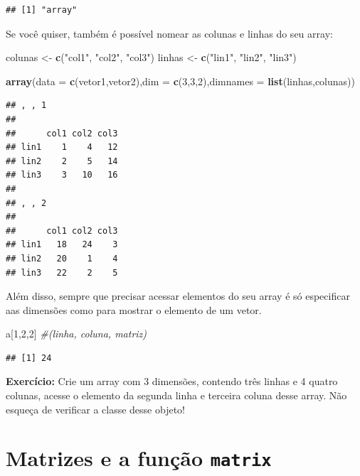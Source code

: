 \documentclass[]{book}
\newenvironment{Shaded}{\begin{snugshade}}{\end{snugshade}}
\newcommand{\KeywordTok}[1]{\textcolor[rgb]{0.13,0.29,0.53}{\textbf{#1}}}
\newcommand{\DataTypeTok}[1]{\textcolor[rgb]{0.13,0.29,0.53}{#1}}
\newcommand{\DecValTok}[1]{\textcolor[rgb]{0.00,0.00,0.81}{#1}}
\newcommand{\StringTok}[1]{\textcolor[rgb]{0.31,0.60,0.02}{#1}}
\newcommand{\CommentTok}[1]{\textcolor[rgb]{0.56,0.35,0.01}{\textit{#1}}}
\newcommand{\NormalTok}[1]{#1}
\theoremstyle{definition}
\theoremstyle{definition}
\theoremstyle{definition}
\theoremstyle{remark}
\begin{document}
\begin{verbatim}
## [1] "array"
\end{verbatim}

Se você quiser, também é possível nomear as colunas e linhas do seu
array:

\begin{Shaded}
\begin{Highlighting}[]
\NormalTok{colunas <-}\StringTok{ }\KeywordTok{c}\NormalTok{(}\StringTok{"col1"}\NormalTok{, }\StringTok{"col2"}\NormalTok{, }\StringTok{"col3"}\NormalTok{)}
\NormalTok{linhas <-}\StringTok{ }\KeywordTok{c}\NormalTok{(}\StringTok{"lin1"}\NormalTok{, }\StringTok{"lin2"}\NormalTok{, }\StringTok{"lin3"}\NormalTok{)}

\KeywordTok{array}\NormalTok{(}\DataTypeTok{data =} \KeywordTok{c}\NormalTok{(vetor1,vetor2),}\DataTypeTok{dim =} \KeywordTok{c}\NormalTok{(}\DecValTok{3}\NormalTok{,}\DecValTok{3}\NormalTok{,}\DecValTok{2}\NormalTok{),}\DataTypeTok{dimnames =} \KeywordTok{list}\NormalTok{(linhas,colunas))}
\end{Highlighting}
\end{Shaded}

\begin{verbatim}
## , , 1
## 
##      col1 col2 col3
## lin1    1    4   12
## lin2    2    5   14
## lin3    3   10   16
## 
## , , 2
## 
##      col1 col2 col3
## lin1   18   24    3
## lin2   20    1    4
## lin3   22    2    5
\end{verbatim}

Além disso, sempre que precisar acessar elementos do seu array é só
especificar aas dimensões como para mostrar o elemento de um vetor.

\begin{Shaded}
\begin{Highlighting}[]
\NormalTok{a[}\DecValTok{1}\NormalTok{,}\DecValTok{2}\NormalTok{,}\DecValTok{2}\NormalTok{] }\CommentTok{#(linha, coluna, matriz)}
\end{Highlighting}
\end{Shaded}

\begin{verbatim}
## [1] 24
\end{verbatim}

\textbf{Exercício:} Crie um array com 3 dimensões, contendo três linhas
e 4 quatro colunas, acesse o elemento da segunda linha e terceira coluna
desse array. Não esqueça de verificar a classe desse objeto!

\section{\texorpdfstring{Matrizes e a função
\texttt{matrix}}{Matrizes e a função matrix}}\label{matrizes-e-a-funcao-matrix}
\end{document}
